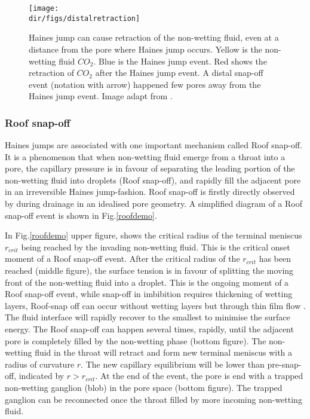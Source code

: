 \begin{figure}[htbp]
  \centering
  \texttt{[image: \\dir/figs/distalretraction]}
  \caption{Haines jump can cause retraction of the non-wetting fluid, even at a distance from the pore where Haines jump occurs. Yellow is the non-wetting fluid $CO_2$. Blue is the Haines jump event. Red shows the retraction of $CO_2$ after the Haines jump event. A distal snap-off event (notation with arrow) happened few pores away from the Haines jump event. Image adapt from \citet{andrew2015imaging}.}
  \label{distalretraction}
\end{figure}

\subsubsection{Roof snap-off}
Haines jumps are associated with one important mechanism called Roof snap-off. It is a phenomenon that when non-wetting fluid emerge from a throat into a pore, the capillary pressure is in favour of separating the leading portion of the non-wetting fluid into droplets (Roof snap-off), and rapidly fill the adjacent pore in an irreversible Haines jump-fashion. Roof snap-off is firstly directly observed by \citet{roof1970snap} during drainage in an idealised pore geometry. A simplified diagram of a Roof snap-off event is shown in Fig.\ref{roofdemo}.

In Fig.\ref{roofdemo} upper figure, shows the critical radius of the terminal meniscus $r_{crit}$ being reached by the invading non-wetting fluid. This is the critical onset moment of a Roof snap-off event. After the critical radius of the $r_{crit}$ has been reached (middle figure), the surface tension is in favour of splitting the moving front of the non-wetting fluid into a droplet. This is the ongoing moment of a Roof snap-off event, while snap-off in imbibition requires thickening of wetting layers, Roof-snap off can occur without wetting layers but through thin film flow \citep{roof1970snap, gauglitz1990dynamics}. The fluid interface will rapidly recover to the smallest to minimise the surface energy. The Roof snap-off can happen several times, rapidly, until the adjacent pore is completely filled by the non-wetting phase (bottom figure). The non-wetting fluid in the throat will retract and form new terminal meniscus with a radius of curvature $r$. The new capillary equilibrium will be lower than pre-snap-off, indicated by $r>r_{crit}$. At the end of the event, the pore is end with a trapped non-wetting ganglion (blob) in the pore space (bottom figure). The trapped ganglion can be reconnected once the throat filled by more incoming non-wetting fluid.

